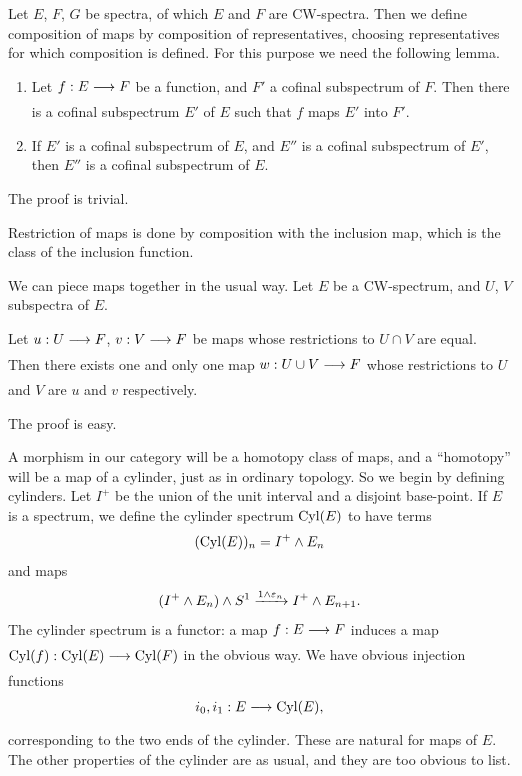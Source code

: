 \documentclass[../main]{subfiles}
\begin{document}
Let $E$, $F$, $G$ be spectra, of which $E$ and $F$ are CW-spectra. Then we define composition of maps by composition of representatives, choosing representatives for which composition is defined. For this purpose we need the following lemma.

\begin{lemma}
    \begin{enumerate}
    \item[(i)]  Let $f:E\lar{} F$ be a function, and $F'$ a cofinal subspectrum of $F$. Then there is a cofinal subspectrum $E'$ of $E$ such that $f$ maps $E'$ into $F'$.
    \item[(ii)] If $E'$ is a cofinal subspectrum of $E$, and $E''$ is a cofinal subspectrum of $E'$, then $E''$ is a cofinal subspectrum of $E$.
    \end{enumerate}
\end{lemma}

The proof is trivial.

Restriction of maps is done by composition with the inclusion map, which is the class of the inclusion function.

We can piece maps together in the usual way. Let $E$ be a CW-spectrum, and $U$, $V$ subspectra of $E$.

\begin{lemma}
Let $u: U\lar{} F$, $v: V\lar{} F$ be maps whose restrictions to $U\cap V$ are equal. Then there exists one and only one map $w: U\cup V \lar{} F$ whose restrictions to $U$ and $V$ are $u$ and $v$ respectively.
\end{lemma}

The proof is easy.

A morphism in our category will be a homotopy class of maps, and a ``homotopy'' will be a map of a cylinder, just as in ordinary topology. So we begin by defining cylinders. Let $I^+$ be the union of the unit interval and a disjoint base-point. If $E$ is a spectrum, we define the cylinder spectrum $\mathrm{Cyl}(E)$ to have terms
\[
(\mathrm{Cyl}(E))_n = I^+ \wedge E_n
\]
and maps
\[
(I^+ \wedge E_n)\wedge S^1
\vra{1\wedge \varepsilon_n}
I^+ \wedge E_{n+1}.
\]
The cylinder spectrum is a functor: a map $f: E\lar{} F$ induces a map $\te{Cyl}(f): \te{Cyl}(E) \lar{} \te{Cyl}(F)$ in the obvious way. We have obvious injection functions
\[
i_0,i_1: E \lar{} \te{Cyl}(E),
\]
corresponding to the two ends of the cylinder. These are natural for maps of $E$. The other properties of the cylinder are as usual, and they are too obvious to list.
\end{document}
